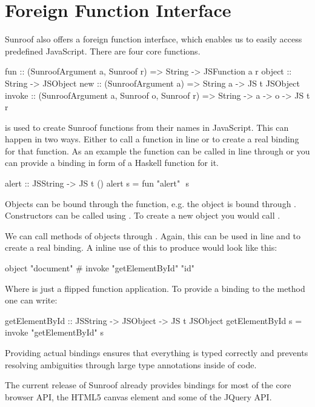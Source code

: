  
\section{Foreign Function Interface}
\label{sec:ffi}

Sunroof also offers a 
foreign function interface, which enables us to easily 
access predefined JavaScript. There are four core functions.
\begin{Code}
fun    :: (SunroofArgument a, Sunroof r) 
       => String -> JSFunction a r
object :: String -> JSObject
new    :: (SunroofArgument a) 
       => String a -> JS t JSObject
invoke :: (SunroofArgument a, Sunroof o, Sunroof r) 
       => String -> a -> o -> JS t r
\end{Code}
 is used to create Sunroof functions from their names in JavaScript.
This can happen in two ways. Either to call a function in line or to 
create a real binding for that function. As an example 
the  function can be called in line through 
or you can provide a binding in form of a Haskell function for it.
\begin{Code}
alert :: JSString -> JS t ()
alert s = fun "alert" $$ s
\end{Code}

Objects can be bound through the  function, e.g.
the  object is bound through .
Constructors can be called using . To create a new
object you would call .

We can call methods of objects through . Again, this 
can be used in line and to create a real binding. A inline 
use of this to produce  would look like this: 
\begin{Code}
object "document" # invoke "getElementById" "id"
\end{Code}
Where \Src{\#} is just a flipped function application. To provide a binding 
to the  method one can write:
\begin{Code}
getElementById :: JSString -> JSObject -> JS t JSObject
getElementById s = invoke "getElementById" s
\end{Code}

Providing actual bindings ensures that
everything is typed correctly and prevents resolving ambiguities 
through large type annotations inside of code.

The current release of Sunroof already provides bindings for most of the 
core browser API, the HTML5 canvas element and some of the JQuery API.

